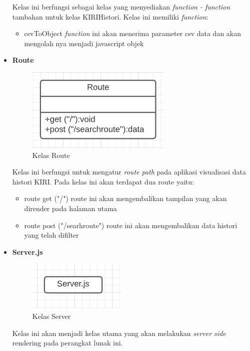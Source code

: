 \begin{itemize}
\begin{figure}[H]
    \end{figure}
    Kelas ini berfungsi sebagai kelas yang menyediakan \textit{function - function} tambahan untuk kelas KIRIHistori. Kelas ini memiliki \textit{function}:
    \begin{itemize}
        \item csvToObject \textit{function} ini akan menerima parameter csv data dan akan mengolah nya menjadi javascript objek
    \end{itemize}
    \item \textbf{Route}
        \begin{figure}[H]
        	\centering  
        	\includegraphics[scale=1]{Gambar/Route-Class.PNG}  
        	\caption[Kelas Route]{Kelas Route} 
        	\label{fig:routeClass} 
    \end{figure}
    Kelas ini berfungsi untuk mengatur \textit{route path} pada aplikasi visualisasi data histori KIRI. Pada kelas ini akan terdapat dua route yaitu:
    \begin{itemize}
        \item route get ("/") route ini akan mengembalikan tampilan yang akan dirender pada halaman utama
        \item route post ("/searhroute") route ini akan mengembalikan data histori yang telah difilter
    \end{itemize}
    \item \textbf{Server.js}
    \begin{figure}[H]
        	\centering  
        	\includegraphics[scale=1]{Gambar/Server-Class.PNG}  
        	\caption[Kelas Server]{Kelas Server} 
        	\label{fig:serverClass} 
    \end{figure}
    Kelas ini akan menjadi kelas utama yang akan melakukan \textit{server side} rendering pada perangkat lunak ini.
    

\end{itemize}
